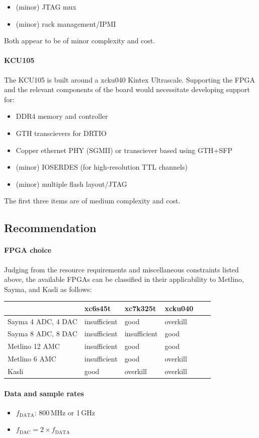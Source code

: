 \documentclass[11pt]{paper}
\begin{document}
\begin{itemize}
   \item (minor) JTAG mux
   \item (minor) rack management/IPMI
\end{itemize}

Both appear to be of minor complexity and cost.

\paragraph{KCU105}

The KCU105 is built around a xcku040 Kintex Ultrascale.
Supporting the FPGA and the relevant components of the board would necessitate developing support for:

\begin{itemize}
    \item DDR4 memory and controller
    \item GTH transcievers for DRTIO
    \item Copper ethernet PHY (SGMII) or transciever based using GTH+SFP
    \item (minor) IOSERDES (for high-resolution TTL channels)
    \item (minor) multiple flash layout/JTAG
\end{itemize}

The first three items are of medium complexity and cost.

\subsection{Recommendation}

\paragraph{FPGA choice} Judging from the resource requirements and miscellaneous constraints listed above, the available FPGAs can be classified in their applicability to Metlino, Sayma, and Kasli as follows:

\begin{tabular}{l|lllll}
	 & xc6s45t & xc7k325t & xcku040 \\\hline
   Sayma 4 ADC, 4 DAC & insufficient & good & overkill \\
   Sayma 8 ADC, 8 DAC & insufficient & insufficient & good \\
   Metlino 12 AMC & insufficient & good & good \\
   Metlino 6 AMC & insufficient & good & overkill \\
   Kasli & good & overkill & overkill\\
\end{tabular}

\paragraph{Data and sample rates}

\begin{itemize}
   \item $f_\mathrm{DATA}$: 800\,MHz or 1\,GHz
   \item $f_\mathrm{DAC} = 2\times f_\mathrm{DATA}$
\end{itemize}
\end{document}
